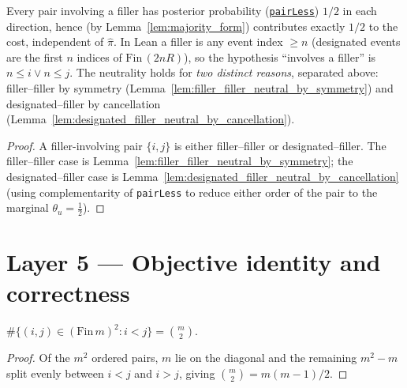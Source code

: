 \begin{lemma}
\label{lem:filler_neutral}
\leanok
{}
Every pair involving a filler has posterior probability
(\href{https://github.com/chinmayhegde/lea-frontier/blob/93d37a15db4cbca0a10870f977b5f223cf04c91f/LeaFrontier/OrderingRecovery/Defs.lean#L101}{\texttt{pairLess}})
$1/2$ in each direction, hence (by Lemma~\ref{lem:majority_form}) contributes
exactly $1/2$ to the cost, independent of $\hat\pi$. In Lean a filler is any event
index $\ge n$ (designated events are the first $n$ indices of
$\mathrm{Fin}\,(2nR)$), so the hypothesis ``involves a filler'' is
$n \le i \vee n \le j$. The neutrality holds for \emph{two distinct reasons},
separated above: filler--filler by symmetry
(Lemma~\ref{lem:filler_filler_neutral_by_symmetry}) and designated--filler by
cancellation (Lemma~\ref{lem:designated_filler_neutral_by_cancellation}).
\end{lemma}
\begin{proof}
\leanok
{}
A filler-involving pair $\{i,j\}$ is either filler--filler or designated--filler.
The filler--filler case is Lemma~\ref{lem:filler_filler_neutral_by_symmetry}; the
designated--filler case is Lemma~\ref{lem:designated_filler_neutral_by_cancellation}
(using complementarity of \texttt{pairLess} to reduce either order of the pair to
the marginal $\theta_u = \tfrac12$).
\end{proof}

\section{Layer 5 --- Objective identity and correctness}

\begin{lemma}
\label{lem:card_lt_pairs}
\leanok
$\#\{(i,j)\in(\mathrm{Fin}\,m)^2 : i<j\} = \binom m2$.
\end{lemma}
\begin{proof}
\leanok
Of the $m^2$ ordered pairs, $m$ lie on the diagonal and the remaining
$m^2 - m$ split evenly between $i<j$ and $i>j$, giving $\binom m2 = m(m-1)/2$.
\end{proof}

